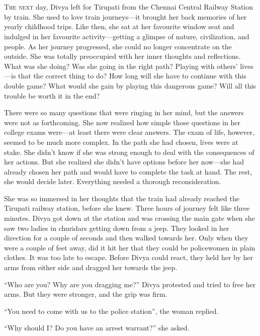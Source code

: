 \chapter{}

\lettrine{T}{he next} day, Divya left for Tirupati from the Chennai Central
Railway Station by train. She used to love train journeys—it brought her back
memories of her yearly childhood trips. Like then, she sat at her favourite
window seat and indulged in her favourite activity—getting a glimpse of nature,
civilization, and people. As her journey progressed, she could no longer concentrate
on the outside. She was totally preoccupied with her inner thoughts and reflections.
What was she doing?  Was she going in the right path? Playing with others'
lives—is that the correct thing to do? How long will she have to continue with
this double game? What would she gain by playing this dangerous game? Will all
this trouble be worth it in the end?

There were so many questions that were ringing in her mind, but the answers were
not as forthcoming. She now realized how simple those questions in her college
exams were—at least there were clear answers. The exam of life, however, seemed
to be much more complex. In the path she had chosen, lives were at stake. She
didn't know if she was strong enough to deal with the consequences of her
actions. But she realized she didn't have options before her now—she had already
chosen her path and would have to complete the task at hand. The rest, she would
decide later. Everything needed a thorough reconsideration.

She was so immersed in her thoughts that the train had already reached the
Tirupati railway station, before she knew. Three hours of journey felt like
three minutes. Divya got down at the station and was crossing the main gate when
she saw two ladies in churidars getting down from a jeep. They looked in her
direction for a couple of seconds and then walked towards her. Only when they
were a couple of feet away, did it hit her that they could be policewomen in
plain clothes. It was too late to escape.  Before Divya could react, they held
her by her arms from either side and dragged her towards the jeep.

“Who are you? Why are you dragging me?” Divya protested and tried to free her
arms. But they were stronger, and the grip was firm.

“You need to come with us to the police station”, the woman replied.

“Why should I? Do you have an arrest warrant?” she asked.

